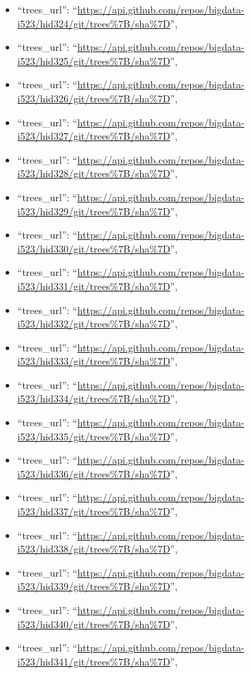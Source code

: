 \begin{itemize}
\item
  ``trees\_url'':
  ``\url{https://api.github.com/repos/bigdata-i523/hid324/git/trees\%7B/sha\%7D}'',
\item
  ``trees\_url'':
  ``\url{https://api.github.com/repos/bigdata-i523/hid325/git/trees\%7B/sha\%7D}'',
\item
  ``trees\_url'':
  ``\url{https://api.github.com/repos/bigdata-i523/hid326/git/trees\%7B/sha\%7D}'',
\item
  ``trees\_url'':
  ``\url{https://api.github.com/repos/bigdata-i523/hid327/git/trees\%7B/sha\%7D}'',
\item
  ``trees\_url'':
  ``\url{https://api.github.com/repos/bigdata-i523/hid328/git/trees\%7B/sha\%7D}'',
\item
  ``trees\_url'':
  ``\url{https://api.github.com/repos/bigdata-i523/hid329/git/trees\%7B/sha\%7D}'',
\item
  ``trees\_url'':
  ``\url{https://api.github.com/repos/bigdata-i523/hid330/git/trees\%7B/sha\%7D}'',
\item
  ``trees\_url'':
  ``\url{https://api.github.com/repos/bigdata-i523/hid331/git/trees\%7B/sha\%7D}'',
\item
  ``trees\_url'':
  ``\url{https://api.github.com/repos/bigdata-i523/hid332/git/trees\%7B/sha\%7D}'',
\item
  ``trees\_url'':
  ``\url{https://api.github.com/repos/bigdata-i523/hid333/git/trees\%7B/sha\%7D}'',
\item
  ``trees\_url'':
  ``\url{https://api.github.com/repos/bigdata-i523/hid334/git/trees\%7B/sha\%7D}'',
\item
  ``trees\_url'':
  ``\url{https://api.github.com/repos/bigdata-i523/hid335/git/trees\%7B/sha\%7D}'',
\item
  ``trees\_url'':
  ``\url{https://api.github.com/repos/bigdata-i523/hid336/git/trees\%7B/sha\%7D}'',
\item
  ``trees\_url'':
  ``\url{https://api.github.com/repos/bigdata-i523/hid337/git/trees\%7B/sha\%7D}'',
\item
  ``trees\_url'':
  ``\url{https://api.github.com/repos/bigdata-i523/hid338/git/trees\%7B/sha\%7D}'',
\item
  ``trees\_url'':
  ``\url{https://api.github.com/repos/bigdata-i523/hid339/git/trees\%7B/sha\%7D}'',
\item
  ``trees\_url'':
  ``\url{https://api.github.com/repos/bigdata-i523/hid340/git/trees\%7B/sha\%7D}'',
\item
  ``trees\_url'':
  ``\url{https://api.github.com/repos/bigdata-i523/hid341/git/trees\%7B/sha\%7D}'',

\end{itemize}
